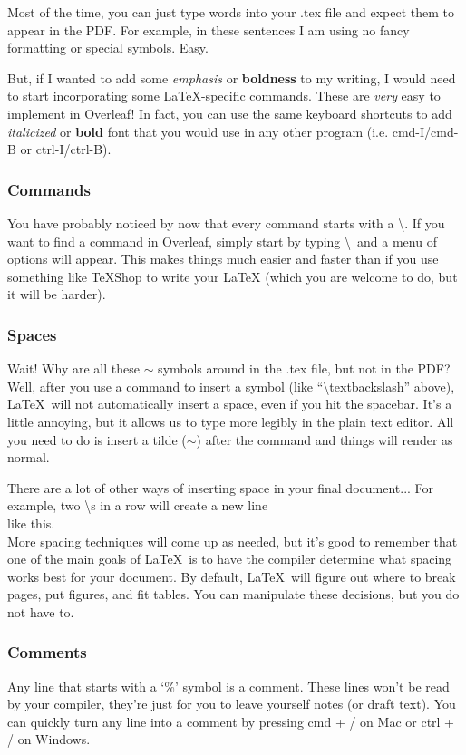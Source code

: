 \documentclass{article} %
\begin{document}
Most of the time, you can just type words into your .tex file and expect them to appear in the PDF. For example, in these sentences I am using no fancy formatting or special symbols. Easy.

But, if I wanted to add some \emph{emphasis} or \textbf{boldness} to my writing, I would need to start incorporating some LaTeX-specific commands. These are \textit{very} easy to implement in Overleaf! In fact, you can use the same keyboard shortcuts to add \textit{italicized} or \textbf{bold} font that you would use in any other program (i.e. cmd-I/cmd-B or ctrl-I/ctrl-B). 

\subsubsection*{Commands}
You have probably noticed by now that every command starts with a \textbackslash. If you want to find a command in Overleaf, simply start by typing \textbackslash~and a menu of options will appear. This makes things much easier and faster than if you use something like TeXShop to write your LaTeX (which you are welcome to do, but it will be harder).

\subsubsection*{Spaces}
Wait! Why are all these $\sim$ symbols around in the .tex file, but not in the PDF? Well, after you use a command to insert a symbol (like ``\textbackslash textbackslash'' above), \LaTeX~will not automatically insert a space, even if you hit the spacebar. It's a little annoying, but it allows us to type more legibly in the plain text editor. All you need to do is insert a tilde ($\sim$) after the command and things will render as normal.

There are a lot of other ways of inserting space in your final document... For example, two \textbackslash s in a row will create a new line\\ like this. \\  More spacing techniques will come up as needed, but it's good to remember that one of the main goals of \LaTeX~is to have the compiler determine what spacing works best for your document. By default, \LaTeX~will figure out where to break pages, put figures, and fit tables. You can manipulate these decisions, but you do not have to.

\subsubsection*{Comments}
Any line that starts with a `\%' symbol is a comment. These lines won't be read by your compiler, they're just for you to leave yourself notes (or draft text). You can quickly turn any line into a comment by pressing cmd + / on Mac or ctrl + / on Windows.
\end{document}
